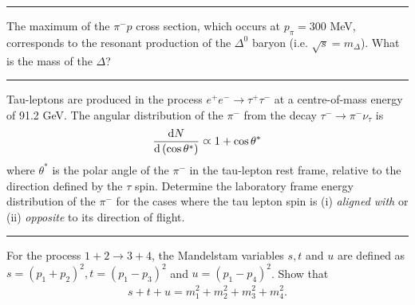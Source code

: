 \noindent\rule{7in}{1.5pt}


\begin{problem}{2.10}
The maximum of the $\pi^-p$ cross section, which occurs at $p_\pi=300$ MeV, corresponds to the resonant production of the $\Delta^0$ baryon (i.e. $\sqrt{s}=m_\Delta$). What is the mass of the $\Delta$?
\end{problem}

\begin{solution}
        
\end{solution} 

\noindent\rule{7in}{1.5pt}


\begin{problem}{2.11}
   Tau-leptons are produced in the process $e^+e^-\to\tau^+\tau^-$ at a centre-of-mass energy of 91.2 GeV. The angular distribution of the $\pi^-$ from the decay $\tau^-\to\pi^-\nu_\tau$ is 
   \begin{align*}
        \frac{\mathop{}\!\mathrm{d} N}{ \mathop{}\!\mathrm{d} \left(\cos\theta^\ast\right)} \varpropto 1 + \cos\theta^\ast
   \end{align*} 
   where $\theta^\ast$ is the polar angle of the $\pi^-$ in the tau-lepton rest frame, relative to the direction defined by the $\tau$ spin. Determine the laboratory frame energy distribution of the $\pi^-$ for the cases where the tau lepton spin is (i) \textit{aligned with} or (ii) \textit{opposite} to its direction of flight.
\end{problem}
    
\begin{solution}
            
\end{solution} 
    
\noindent\rule{7in}{1.5pt}



\begin{problem}{2.12}
   For the process $1+2 \to 3+4$, the Mandelstam variables $s,t$ and $u$ are defined as $s=(p_1+p_2)^2,t=(p_1-p_3)^2$ and $u=(p_1-p_4)^2$. Show that
   \begin{align*}
        s+t+u = m_1^2+m_2^2+m_3^2+m_4^2.
   \end{align*} 
\end{problem}
    
